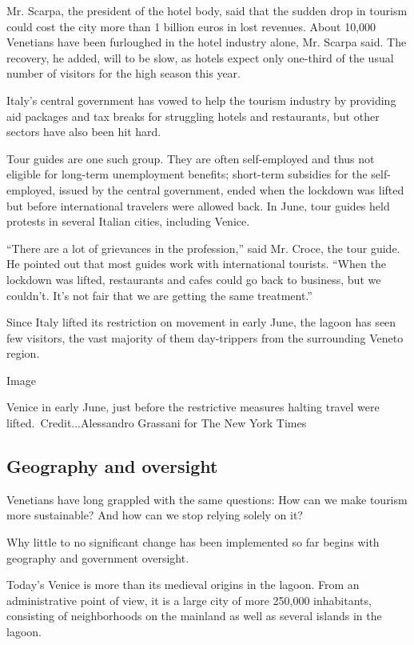 Mr. Scarpa, the president of the hotel body, said that the sudden drop
in tourism could cost the city more than 1 billion euros in lost
revenues. About 10,000 Venetians have been furloughed in the hotel
industry alone, Mr. Scarpa said. The recovery, he added, will to be
slow, as hotels expect only one-third of the usual number of visitors
for the high season this year.

Italy's central government has vowed to help the tourism industry by
providing aid packages and tax breaks for struggling hotels and
restaurants, but other sectors have also been hit hard.

Tour guides are one such group. They are often self-employed and thus
not eligible for long-term unemployment benefits; short-term subsidies
for the self-employed, issued by the central government, ended when the
lockdown was lifted but before international travelers were allowed
back. In June, tour guides held protests in several Italian cities,
including Venice.

``There are a lot of grievances in the profession,'' said Mr. Croce, the
tour guide. He pointed out that most guides work with international
tourists. ``When the lockdown was lifted, restaurants and cafes could go
back to business, but we couldn't. It's not fair that we are getting the
same treatment.''

Since Italy lifted its restriction on movement in early June, the lagoon
has seen few visitors, the vast majority of them day-trippers from the
surrounding Veneto region.

Image

Venice in early June, just before the restrictive measures halting
travel were lifted.~Credit...Alessandro Grassani for The New York Times

\hypertarget{geography-and-oversight}{%
\subsection{Geography and oversight}\label{geography-and-oversight}}

Venetians have long grappled with the same questions: How can we make
tourism more sustainable? And how can we stop relying solely on it?

Why little to no significant change has been implemented so far begins
with geography and government oversight.

Today's Venice is more than its medieval origins in the lagoon. From an
administrative point of view, it is a large city of more 250,000
inhabitants, consisting of neighborhoods on the mainland as well as
several islands in the lagoon.

